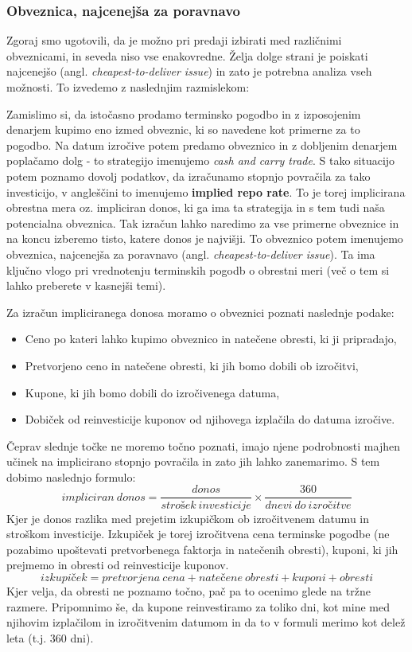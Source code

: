 \documentclass[a4paper, 11pt]{article}
\begin{document}

\subsubsection{Obveznica, najcenejša za poravnavo}
Zgoraj smo ugotovili, da je možno pri predaji izbirati med različnimi obveznicami, in seveda niso
vse enakovredne. Želja dolge strani je poiskati najcenejšo (angl. \textit{cheapest-to-deliver
issue}) in zato je potrebna analiza vseh možnosti. To izvedemo z naslednjim razmislekom:

Zamislimo si, da istočasno prodamo terminsko pogodbo in z izposojenim denarjem kupimo eno 
izmed obveznic, ki so navedene kot primerne za to pogodbo. Na datum izročive potem predamo 
obveznico in z dobljenim denarjem poplačamo dolg - to strategijo imenujemo \textit{cash 
and carry trade}. S tako situacijo potem poznamo dovolj podatkov, da izračunamo stopnjo 
povračila za tako investicijo, v angleščini to imenujemo \textbf{implied repo rate}. To je 
torej implicirana obrestna mera oz. impliciran donos, ki ga ima ta strategija in s tem tudi 
naša potencialna obveznica. Tak izračun lahko naredimo za vse primerne obveznice in na 
koncu izberemo tisto, katere donos je najvišji. To obveznico potem imenujemo obveznica, 
najcenejša za poravnavo (angl. \textit{cheapest-to-deliver issue}). Ta ima ključno vlogo
pri vrednotenju terminskih pogodb o obrestni meri (več o tem si lahko preberete v kasnejši temi).

Za izračun impliciranega donosa moramo o obveznici poznati naslednje podake:

\begin{itemize}
    \item Ceno po kateri lahko kupimo obveznico in natečene obresti, ki ji pripradajo,
    \item Pretvorjeno ceno in natečene obresti, ki jih bomo dobili ob izročitvi, 
    \item Kupone, ki jih bomo dobili do izročivenega datuma,
    \item Dobiček od reinvesticije kuponov od njihovega izplačila do datuma izročive.
\end{itemize}

Čeprav slednje točke ne moremo točno poznati, imajo njene podrobnosti majhen učinek na 
implicirano stopnjo povračila in zato jih lahko zanemarimo. S tem dobimo naslednjo formulo:
%
$$ impliciran\:donos = \frac{donos}{strošek\:investicije} \times
\frac{360}{dnevi\:do\:izročitve} $$
%
Kjer je donos razlika med prejetim izkupičkom ob izročitvenem datumu in stroškom investicije.
Izkupiček je torej izročitvena cena terminske pogodbe (ne pozabimo upoštevati pretvorbenega 
faktorja in natečenih obresti), kuponi, ki jih prejmemo in obresti od reinvesticije kuponov. 
%
$$ izkupiček = pretvorjena\:cena + natečene\:obresti + kuponi + obresti $$
%
Kjer velja, da obresti ne poznamo točno, pač pa to ocenimo glede na tržne razmere. Pripomnimo
še, da kupone reinvestiramo za toliko dni, kot mine med njihovim izplačilom in izročitvenim
datumom in da to v formuli merimo kot delež leta (t.j. $360$ dni). 
\end{document}
